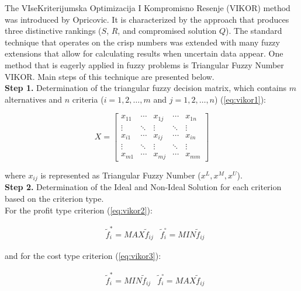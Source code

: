 
The VIseKriterijumska Optimizacija I Kompromisno Resenje (VIKOR) method was introduced by Opricovic. It is characterized by the approach that produces three distinctive rankings ($S$, $R$, and compromised solution $Q$). The standard technique that operates on the crisp numbers was extended with many fuzzy extensions that allow for calculating results when uncertain data appear. One method that is eagerly applied in fuzzy problems is Triangular Fuzzy Number VIKOR. Main steps of this technique are presented below. \\ 

\noindent \textbf{Step 1.} Determination of the triangular fuzzy decision matrix, which contains $m$ alternatives and $n$ criteria ($i = 1, 2, \ldots, m$ and $j = 1, 2, \ldots, n$) (\ref{eq:vikor1}):

\begin{equation}
X=\left[\begin{array}{ccccc}
x_{11} & \cdots & x_{1 j} & \cdots & x_{1 n} \\
\vdots & \ddots & \vdots & \ddots & \vdots \\
x_{i 1} & \cdots & x_{i j} & \cdots & x_{i n} \\
\vdots & \ddots & \vdots & \ddots & \vdots \\
x_{m 1} & \cdots & x_{m j} & \cdots & x_{m m}
\end{array}\right]
\label{eq:vikor1}
\end{equation}

\noindent where $x_{ij}$ is represented as Triangular Fuzzy Number ($x^L, x^M, x^U$). \\


\noindent \textbf{Step 2.} Determination of the Ideal and Non-Ideal Solution for each criterion based on the criterion type. \\

\noindent For the profit type criterion (\ref{eq:vikor2}):

\begin{equation}
    \begin{aligned}
    & \tilde{f}_{i}^{*}=M A X \tilde{f}_{i j}
    & \tilde{f}_{i}^{\circ}=M I N \tilde{f}_{i j}
    \end{aligned}
    \label{eq:vikor2}
\end{equation}

\noindent and for the cost type criterion (\ref{eq:vikor3}):

\begin{equation}
\begin{aligned}
    & \tilde{f}_{i}^{*}=M I N \tilde{f}_{i j}
    & \tilde{f}_{i}^{\circ}=M A X \tilde{f}_{i j}
\end{aligned}
    \label{eq:vikor3}
\end{equation}

